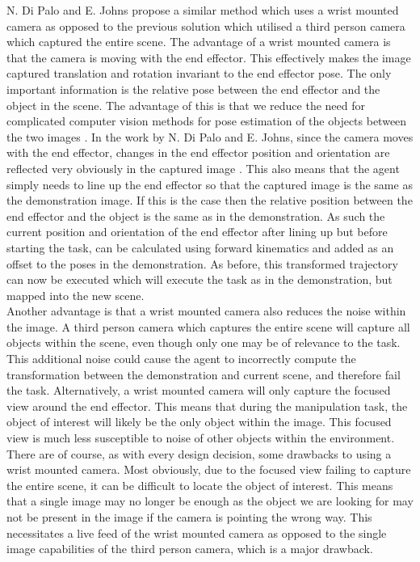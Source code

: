 N. Di Palo and E. Johns propose a similar method \cite{one-shot-imitation} which uses a wrist mounted camera as opposed to the previous solution which utilised a third person camera which captured the entire scene. The advantage of a wrist mounted camera is that the camera is moving with the end effector. This effectively makes the image captured translation and rotation invariant to the end effector pose. The only important information is the relative pose between the end effector and the object in the scene. The advantage of this is that we reduce the need for complicated computer vision methods for pose estimation of the objects between the two images \cite{one-shot-pose-estimate}. In the work by N. Di Palo and E. Johns, since the camera moves with the end effector, changes in the end effector position and orientation are reflected very obviously in the captured image \cite{one-shot-imitation}. This also means that the agent simply needs to line up the end effector so that the captured image is the same as the demonstration image. If this is the case then the relative position between the end effector and the object is the same as in the demonstration. As such the current position and orientation of the end effector after lining up but before starting the task, can be calculated using forward kinematics and added as an offset to the poses in the demonstration. As before, this transformed trajectory can now be executed which will execute the task as in the demonstration, but mapped into the new scene.\\

Another advantage is that a wrist mounted camera also reduces the noise within the image. A third person camera which captures the entire scene will capture all objects within the scene, even though only one may be of relevance to the task. This additional noise could cause the agent to incorrectly compute the transformation between the demonstration and current scene, and therefore fail the task. Alternatively, a wrist mounted camera will only capture the focused view around the end effector. This means that during the manipulation task, the object of interest will likely be the only object within the image. This focused view is much less susceptible to noise of other objects within the environment.\\

There are of course, as with every design decision, some drawbacks to using a wrist mounted camera. Most obviously, due to the focused view failing to capture the entire scene, it can be difficult to locate the object of interest. This means that a single image may no longer be enough as the object we are looking for may not be present in the image if the camera is pointing the wrong way. This necessitates a live feed of the wrist mounted camera as opposed to the single image capabilities of the third person camera, which is a major drawback.\\

